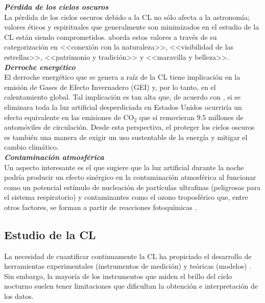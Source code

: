 \textit{\textbf{Pérdida de los cielos oscuros}}\\ 

La pérdida de los cielos oscuros debido a la CL no sólo afecta a la astronomía; valores éticos y espirituales que generalmente son minimizados en el estudio de la CL están siendo comprometidos. \cite{Stone2017} aborda estos valores a través de su categorización en <<conexión con la naturaleza>>, <<visibilidad de las estrellas>>, <<patrimonio y tradición>> y <<maravilla y belleza>>.\\ 


\textit{\textbf{Derroche energético}}\\ 

El derroche energético que se genera a raíz de la CL tiene implicación en la emisión de Gases de Efecto Invernadero (GEI) y, por lo tanto, en el calentamiento global. Tal implicación es tan alta que, de acuerdo con \cite{Gallaway2010}, si se eliminara toda la luz artificial desperdiciada en Estados Unidos ocurriría un efecto equivalente en las emisiones de CO$_{2}$ que si removieran 9.5 millones de automóviles de circulación. Desde esta perspectiva, el proteger los cielos oscuros es también una manera de exigir un uso sustentable de la energía y mitigar el cambio climático.\\ 

\textit{\textbf{Contaminación atmosférica}}\\ 

Un aspecto interesante es el que sugiere que la luz artificial durante la noche podría producir un efecto sinérgico en la contaminación atmosférica al funcionar como un potencial estímulo de nucleación de partículas ultrafinas (peligrosas para el sistema respiratorio) y contaminantes como el ozono troposférico que, entre otros factores, se forman a partir de reacciones fotoquímicas \citep{LibroCL}.\\ 

\newpage 
 
\subsection{Estudio de la CL}

La necesidad de cuantificar continuamente la CL ha propiciado el desarrollo de herramientas experimentales (instrumentos de medición) y teóricas (modelos) \citep{Kocifaj2015}. Sin embargo, la mayoría de los instrumentos que miden el brillo del cielo nocturno suelen tener limitaciones que dificultan la obtención e interpretación de los datos.\\

